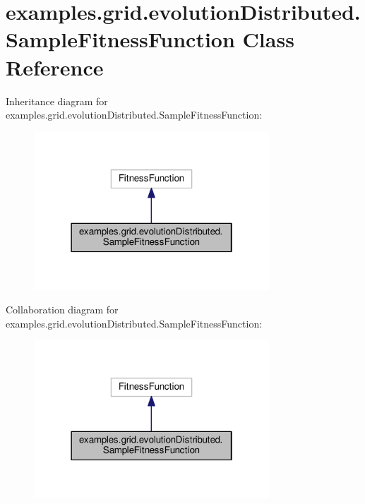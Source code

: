 \hypertarget{classexamples_1_1grid_1_1evolution_distributed_1_1_sample_fitness_function}{\section{examples.\-grid.\-evolution\-Distributed.\-Sample\-Fitness\-Function Class Reference}
\label{classexamples_1_1grid_1_1evolution_distributed_1_1_sample_fitness_function}
}


Inheritance diagram for examples.\-grid.\-evolution\-Distributed.\-Sample\-Fitness\-Function\-:
\nopagebreak
\begin{figure}[H]
\begin{center}
\leavevmode
\includegraphics[width=250pt]{classexamples_1_1grid_1_1evolution_distributed_1_1_sample_fitness_function__inherit__graph}
\end{center}
\end{figure}


Collaboration diagram for examples.\-grid.\-evolution\-Distributed.\-Sample\-Fitness\-Function\-:
\nopagebreak
\begin{figure}[H]
\begin{center}
\leavevmode
\includegraphics[width=250pt]{classexamples_1_1grid_1_1evolution_distributed_1_1_sample_fitness_function__coll__graph}
\end{center}
\end{figure}
